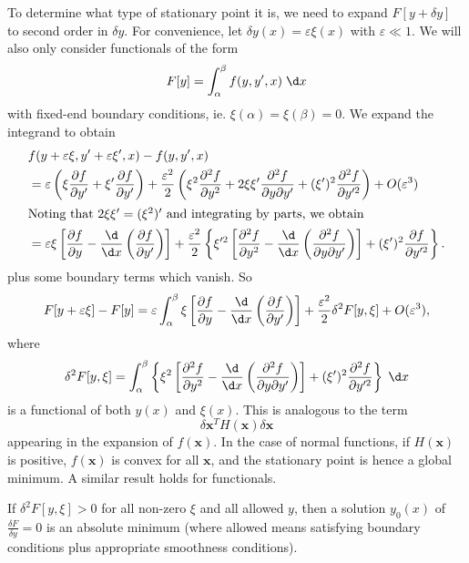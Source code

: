 \documentclass[a4paper]{article}
\begin{document}
To determine what type of stationary point it is, we need to expand $F[y + \delta y]$ to second order in $\delta y$. For convenience, let $\delta y(x) = \varepsilon \xi(x)$ with $\varepsilon \ll 1$. We will also only consider functionals of the form
\[
  F[y] = \int_\alpha^\beta f(y, y', x)\;\d x
\]
with fixed-end boundary conditions, ie. $\xi(\alpha) = \xi(\beta) = 0$. We expand the integrand to obtain
\begin{align*}
 &f(y + \varepsilon \xi, y' + \varepsilon \xi ', x) - f(y, y', x)\\
 &= \varepsilon \left(\xi \frac{\partial f}{\partial y'} + \xi'\frac{\partial f}{\partial y'}\right)  + \frac{\varepsilon^2}{2}\left(\xi^2 \frac{\partial^2 f}{\partial y^2} + 2\xi\xi' \frac{\partial^2 f}{\partial y \partial y'} + (\xi')^2 \frac{\partial^2 f}{\partial y'^2}\right) + O(\varepsilon^3)\\
 \intertext{Noting that $2\xi \xi' = (\xi^2)'$ and integrating by parts, we obtain}
 &= \varepsilon \xi\left[\frac{\partial f}{\partial y} - \frac{\d}{\d x}\left(\frac{\partial f}{\partial y'}\right)\right] + \frac{\varepsilon^2}{2}\left\{\xi'^2\left[\frac{\partial^2 f}{\partial y^2} - \frac{\d}{\d x}\left(\frac{\partial^2 f}{\partial y\partial y'}\right)\right] + (\xi')^2 \frac{\partial f}{\partial y'^2}\right\}.
\end{align*}
plus some boundary terms which vanish. So
\[
  F[y + \varepsilon \xi] - F[y] = \varepsilon \int_\alpha^\beta\xi\left[\frac{\partial f}{\partial y} - \frac{\d}{\d x}\left(\frac{\partial f}{\partial y'}\right)\right] + \frac{\varepsilon^2}{2}\delta^2 F[y, \xi] + O(\varepsilon^3),
\]
where
\[
  \delta^2 F[y,  \xi] = \int_\alpha^\beta \left\{\xi^2 \left[\frac{\partial^2 f}{\partial y^2} - \frac{\d}{\d x}\left(\frac{\partial^2 f}{\partial y \partial y'}\right)\right] + (\xi')^2 \frac{\partial^2 f}{\partial y'^2}\right\}\;\d x
\]
is a functional of both $y(x)$ and $\xi(x)$. This is analogous to the term
\[
  \delta \mathbf{x}^T H(\mathbf{x})\delta \mathbf{x}
\]
appearing in the expansion of $f(\mathbf{x})$. In the case of normal functions, if $H(\mathbf{x})$ is positive, $f(\mathbf{x})$ is convex for all $\mathbf{x}$, and the stationary point is hence a global minimum. A similar result holds for functionals.

If $\delta^2 F[y, \xi] > 0$ for all non-zero $\xi$ and all allowed $y$, then a solution $y_0(x)$ of $\frac{\delta F}{\delta y} = 0$ is an absolute minimum (where allowed means satisfying boundary conditions plus appropriate smoothness conditions).
\end{document}
